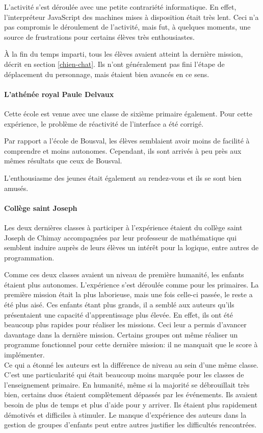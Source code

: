 L'activité s'est déroulée avec une petite contrariété informatique. En effet, l'interpréteur JavaScript des machines mises à disposition était très lent. Ceci n'a pas compromis le déroulement de l'activité, mais fut, à quelques moments, une source de frustrations pour certains élèves très enthousiastes.

À la fin du temps imparti, tous les élèves avaient atteint la dernière mission, décrit en section \ref{chien-chat}. Ils n'ont généralement pas fini l'étape de déplacement du personnage, mais étaient bien avancés en ce sens.

\paragraph{L'athénée royal Paule Delvaux}
Cette école est venue avec une classe de sixième primaire également. Pour cette expérience, le problème de réactivité de l'interface a été corrigé.

Par rapport a l'école de Bousval, les élèves semblaient avoir moins de facilité à comprendre et moins autonomes.
Cependant, ils sont arrivés à peu près aux mêmes résultats que ceux de Bousval.

L'enthousiasme des jeunes était également au rendez-vous et ils se sont bien amusés.

\paragraph{Collège saint Joseph}
Les deux dernières classes à participer à l'expérience étaient du collège saint Joseph de Chimay accompagnées par leur professeur de mathématique qui semblent induire auprès de leurs élèves un intérêt pour la logique, entre autres de programmation.

Comme ces deux classes avaient un niveau de première humanité, les enfants étaient plus autonomes. L'expérience s'est déroulée comme pour les primaires. La première mission était la plus laborieuse, mais une fois celle-ci passée, le reste a été plus aisé. Ces enfants étant plus grands, il a semblé aux auteurs qu'ils présentaient une capacité d'apprentissage plus élevée. En effet, ils ont été beaucoup plus rapides pour réaliser les missions. Ceci leur a permis d'avancer davantage dans la dernière mission. Certains groupes ont même réaliser un programme fonctionnel pour cette dernière mission: il ne manquait que le score à implémenter.\\

Ce qui a étonné les auteurs est la différence de niveau au sein d'une même classe. C'est une particularité qui était beaucoup moins marquée pour les classes de l'enseignement primaire. En humanité, même si la majorité se débrouillait très bien, certains duos étaient complètement dépassés par les événements. Ils avaient besoin de plus de temps et plus d'aide pour y arriver. %
Ils étaient plus rapidement démotivés et difficiles à stimuler. Le manque d'expérience des auteurs dans la gestion de groupes d'enfants peut entre autres justifier les difficultés rencontrées.  %

